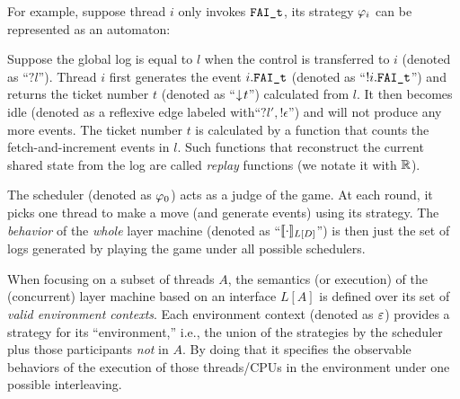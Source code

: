 For example, suppose thread $i$ only invokes  ${\mathrm{\texttt{FAI\_t}}}$, its strategy $\varphi_{i}$  can be represented as an automaton:%
\begin{center}
\end{center}%
Suppose the global log is equal to $l$ when the control is transferred to $i$  (denoted as ``$?l$''). Thread $i$  first generates the event
$i.{\mathrm{\texttt{FAI\_t}}}$ (denoted as ``$!i.{\mathrm{\texttt{FAI\_t}}}$'') and returns the ticket number $t$ (denoted as ``$\downarrow\! t$'') calculated from $l$. It then becomes idle (denoted as a reflexive edge labeled with``$?l',!\epsilon$'')
and will not produce any more events.
The ticket number $t$ is calculated by a  function that counts the fetch-and-increment events in $l$. Such functions that reconstruct the current shared state from the log are called \emph{replay} functions (we notate it with $\mathbb{R}$).

The scheduler (denoted as $\varphi_{0}$) acts as a judge of the game.
At each round, it picks one thread to make a move (and generate events) using its strategy. The \emph{behavior} of the \emph{whole} layer machine (denoted as ``$[\![\cdot]\!]_{L[D]}$'') is then just the set of  logs generated by playing the game under all possible schedulers.

When focusing on a subset of threads $A$, the semantics (or execution) of the (concurrent) layer machine based on an
interface $L[A]$ is defined over its set of \emph{valid environment
contexts}. Each environment context (denoted as $\oracle$) provides a
strategy for its ``environment,'' i.e., the union of the strategies
by the scheduler plus those participants {\em not} in $A$.
By doing that it specifies the observable behaviors of the
execution of those threads/CPUs in the environment under one possible
interleaving.

